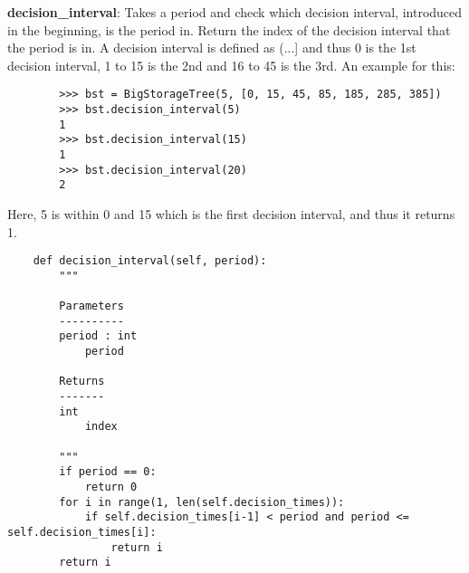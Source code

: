 \documentclass[12pt]{article}
\begin{document}
\textbf{decision\_interval}: Takes a period and check which decision interval, introduced in the beginning, is the period in. Return the index of the decision interval that the period is in. A decision interval is defined as (...] and thus 0 is the 1st decision interval, 1 to 15 is the 2nd and 16 to 45 is the 3rd. An example for this:
\begin{verbatim}
		>>> bst = BigStorageTree(5, [0, 15, 45, 85, 185, 285, 385])
		>>> bst.decision_interval(5)
		1
		>>> bst.decision_interval(15)
		1
		>>> bst.decision_interval(20)
		2
\end{verbatim}
Here, 5 is within 0 and 15 which is the first decision interval, and thus it returns 1.
\begin{verbatim}
	def decision_interval(self, period):
		"""
		
		Parameters
		----------
		period : int
			period

		Returns
		-------
		int
			index

		"""
		if period == 0:
			return 0
		for i in range(1, len(self.decision_times)):
			if self.decision_times[i-1] < period and period <= self.decision_times[i]:
				return i
		return i
\end{verbatim}
\end{document}
